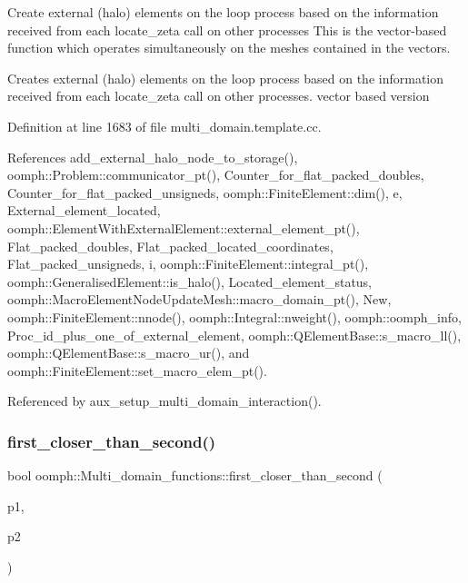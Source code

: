 Create external (halo) elements on the loop process based on the information received from each locate\+\_\+zeta call on other processes This is the vector-\/based function which operates simultaneously on the meshes contained in the vectors. 

Creates external (halo) elements on the loop process based on the information received from each locate\+\_\+zeta call on other processes. vector based version 

Definition at line 1683 of file multi\+\_\+domain.\+template.\+cc.



References add\+\_\+external\+\_\+halo\+\_\+node\+\_\+to\+\_\+storage(), oomph\+::\+Problem\+::communicator\+\_\+pt(), Counter\+\_\+for\+\_\+flat\+\_\+packed\+\_\+doubles, Counter\+\_\+for\+\_\+flat\+\_\+packed\+\_\+unsigneds, oomph\+::\+Finite\+Element\+::dim(), e, External\+\_\+element\+\_\+located, oomph\+::\+Element\+With\+External\+Element\+::external\+\_\+element\+\_\+pt(), Flat\+\_\+packed\+\_\+doubles, Flat\+\_\+packed\+\_\+located\+\_\+coordinates, Flat\+\_\+packed\+\_\+unsigneds, i, oomph\+::\+Finite\+Element\+::integral\+\_\+pt(), oomph\+::\+Generalised\+Element\+::is\+\_\+halo(), Located\+\_\+element\+\_\+status, oomph\+::\+Macro\+Element\+Node\+Update\+Mesh\+::macro\+\_\+domain\+\_\+pt(), New, oomph\+::\+Finite\+Element\+::nnode(), oomph\+::\+Integral\+::nweight(), oomph\+::oomph\+\_\+info, Proc\+\_\+id\+\_\+plus\+\_\+one\+\_\+of\+\_\+external\+\_\+element, oomph\+::\+Q\+Element\+Base\+::s\+\_\+macro\+\_\+ll(), oomph\+::\+Q\+Element\+Base\+::s\+\_\+macro\+\_\+ur(), and oomph\+::\+Finite\+Element\+::set\+\_\+macro\+\_\+elem\+\_\+pt().



Referenced by aux\+\_\+setup\+\_\+multi\+\_\+domain\+\_\+interaction().

\mbox{\label{namespaceoomph_1_1Multi__domain__functions_aee712f5dc126a26cd46b6f717aa1d6c2}} 
\subsubsection{\texorpdfstring{first\+\_\+closer\+\_\+than\+\_\+second()}{first\_closer\_than\_second()}}
{\footnotesize\ttfamily bool oomph\+::\+Multi\+\_\+domain\+\_\+functions\+::first\+\_\+closer\+\_\+than\+\_\+second (\begin{DoxyParamCaption}\item[{const std\+::pair$<$ \hyperlink{classoomph_1_1FiniteElement}{Finite\+Element} $\ast$, \hyperlink{classoomph_1_1Vector}{Vector}$<$ double $>$ $>$ \&}]{p1,  }\item[{const std\+::pair$<$ \hyperlink{classoomph_1_1FiniteElement}{Finite\+Element} $\ast$, \hyperlink{classoomph_1_1Vector}{Vector}$<$ double $>$ $>$ \&}]{p2 }\end{DoxyParamCaption})}


